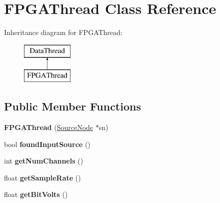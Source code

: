\hypertarget{classFPGAThread}{\section{F\-P\-G\-A\-Thread Class Reference}
\label{classFPGAThread}
}
Inheritance diagram for F\-P\-G\-A\-Thread\-:\begin{figure}[H]
\begin{center}
\leavevmode
\includegraphics[height=2.000000cm]{classFPGAThread}
\end{center}
\end{figure}
\subsection*{Public Member Functions}
\begin{DoxyCompactItemize}
\item 
\hypertarget{classFPGAThread_a3a5d5862b45dfde64caf30c6b173fcea}{{\bfseries F\-P\-G\-A\-Thread} (\hyperlink{classSourceNode}{Source\-Node} $\ast$sn)}\label{classFPGAThread_a3a5d5862b45dfde64caf30c6b173fcea}

\item 
\hypertarget{classFPGAThread_a58958c632739119e57126ceaf7ae9210}{bool {\bfseries found\-Input\-Source} ()}\label{classFPGAThread_a58958c632739119e57126ceaf7ae9210}

\item 
\hypertarget{classFPGAThread_a67ff95c727afa4c92d9705c3b1d9c3ee}{int {\bfseries get\-Num\-Channels} ()}\label{classFPGAThread_a67ff95c727afa4c92d9705c3b1d9c3ee}

\item 
\hypertarget{classFPGAThread_a8d1bd558f7e72a8f578db63736df22cf}{float {\bfseries get\-Sample\-Rate} ()}\label{classFPGAThread_a8d1bd558f7e72a8f578db63736df22cf}

\item 
\hypertarget{classFPGAThread_a30096ea04ec85c0aa301f167fd7a42c4}{float {\bfseries get\-Bit\-Volts} ()}\label{classFPGAThread_a30096ea04ec85c0aa301f167fd7a42c4}

\end{DoxyCompactItemize}
